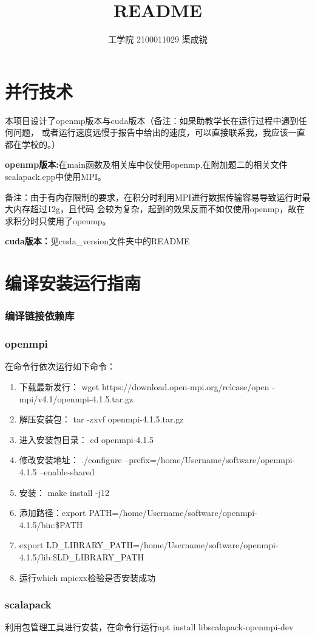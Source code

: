 \documentclass[UTF-8]{ctexart}
\title{README}
\author{工学院 2100011029 渠成锐}
\begin{document}
\maketitle
\tableofcontents
\newpage
\section{并行技术}
本项目设计了openmp版本与cuda版本（备注：如果助教学长在运行过程中遇到任何问题，
或者运行速度远慢于报告中给出的速度，可以直接联系我，我应该一直都在学校的。）\par
\textbf{openmp版本:}在main函数及相关库中仅使用openmp,在附加题二的相关文件scalapack.cpp中使用MPI。\par
备注：由于有内存限制的要求，在积分时利用MPI进行数据传输容易导致运行时最大内存超过12g，且代码
会较为复杂，起到的效果反而不如仅使用openmp，故在求积分时只使用了openmp。\par
\textbf{cuda版本：}见cuda\_version文件夹中的README
\section{编译安装运⾏指南}
\subsubsection{编译链接依赖库}
\subsubsection{openmpi}
在命令行依次运行如下命令：
\begin{enumerate}
    \item 下载最新发行： wget https://download.open-mpi.org/release/open
    -mpi/v4.1/openmpi-4.1.5.tar.gz
    \item 解压安装包： tar -zxvf openmpi-4.1.5.tar.gz
    \item 进入安装包目录： cd openmpi-4.1.5
    \item 修改安装地址： ./configure --prefix=/home/Username/software/openmpi-4.1.5 --enable-shared
    \item 安装： make install -j12
    \item 添加路径：export PATH=/home/Username/software/openmpi-4.1.5/bin:\$PATH
    \item export LD\_LIBRARY\_PATH=/home/Username/software/openmpi-4.1.5/lib:\$LD\_LIBRARY\_PATH
    \item 运行which mpicxx检验是否安装成功
\end{enumerate}
\subsubsection{scalapack}
利用包管理工具进行安装，在命令行运行apt install libscalapack-openmpi-dev
\end{document}
